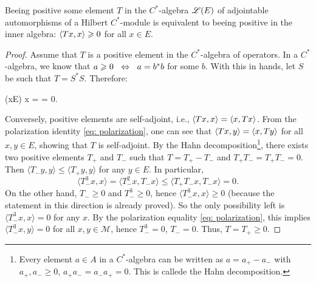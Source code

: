 \begin{proposicao}
    Beeing positive some element $T$ in the $C^*$-algebra $\mathscr L(E)$ of adjointable automorphisms of a Hilbert $C^*$-module is equivalent to beeing positive in the inner algebra: $\langle {Tx},{x}\rangle \geqslant 0$ for all $x\in E$.
    \begin{proof}
    Assume that $T$ is a positive element in the $C^*$-algebra of operators. In a $C^*$-algebra, we know that $a \geqslant 0 \operatorname{\hspace{0.25cm}\Leftrightarrow\hspace{0.25cm}} a=b^*b$ for some $b$. With this in hands, let $S$ be such that $T = S^*S$. Therefore:
    \begin{eqspaced}{(x\in E)}
    x =  =  \bilateral{-0.25cm}{\overset{\ref{def: pre-hilb module}\ref{def item: positivo definido}}\geq} 0.
    \end{eqspaced}
    Conversely, positive elements are self-adjoint, i.e., $\langle {Tx},{x}\rangle = \langle {x},{Tx}\rangle$. From the polarization identity \ref{eq: polarization}, one can see that $\langle {Tx},{y}\rangle = \langle {x},{Ty}\rangle$ for all $x,y \in E$, showing that $T$ is self-adjoint. By the Hahn decomposition\footnote{Every element $a\in A$ in a $C^*$-algebra can be written as $a = a_+-a_-$ with $a_+, a_-\geqslant 0$, $a_+a_-=a_-a_+=0$. This is callede the Hahn decomposition.}, there exists two positive elements $T_+$ and $T_-$ such that $T = T_+-T_-$ and $T_+T_-= T_+T_- = 0$. Then $\langle T_{-} y, y\rangle \leq\langle T_{+} y, y\rangle$ for any $y \in E$. In particular,
    $$
    \langle T_{-}^{3} x, x\rangle=\langle T_{-}^{2} x, T_{-} x\rangle \leq\langle T_{+} T_{-} x, T_{-} x\rangle=0 .
    $$
    On the other hand, $T_{-} \geq 0$ and $T_{-}^{3} \geq 0$, hence $\langle T_{-}^{3} x, x\rangle \geq 0$ (because the statement in this direction is already proved). So the only possibility left is $\langle T_{-}^{3} x, x\rangle=0$ for any $x $. By the polarization equality \ref{eq: polarization}, this implies $\langle T_{-}^{3} x, y\rangle=0$ for all $x, y \in \mathcal{M}$, hence $T_{-}^{3}=0$, $T_{-}=0$. Thus, $T=T_{+} \geq 0$.
    \end{proof}
\end{proposicao}
    
